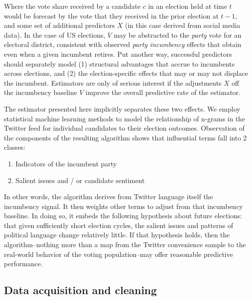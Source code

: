 \documentclass{article}
\begin{document}
Where the vote share received by a candidate $c$ in an election held
at time $t$ would be forecast by the vote that they received in the
prior election at $t-1$, and some set of additional predictors $X$ (in
this case derived from social media data). In the case of US
elections, $V$ may be abstracted to the \textit{party} vote for an
electoral district, consistent with observed \textit{party incumbency}
effects that obtain even when a given incumbent retires. Put another
way, successful predictors should separately model (1) structural
advantages that accrue to incumbents across elections, and (2) the
election-specific effects that may or may not displace the
incumbent. Estimators are only of serious interest if the adjustments
$X$ off the incumbency baseline $V$ improve the overall predictive
rate of the estimator. 

The estimator presented here implicitly separates these two
effects. We employ statistical machine learning methods to model the
relationship of n-grams in the Twitter feed for individual candidates
to their election outcomes. Observation of the components of the
resulting algorithm shows that influential terms fall into 2 classes:

\begin{enumerate}
\item Indicators of the incumbent party
\item Salient issues and / or candidate sentiment
\end{enumerate}

In other words, the algorithm derives from Twitter language itself the
incumbency signal. It then weights other terms to adjust from that
incumbency baseline. In doing so, it embeds the following hypothesis
about future elections: that given sufficiently short election cycles,
the salient issues and patterns of political language change
relatively little. If that hypothesis holds, then the
algorithm--nothing more than a map from the Twitter convenience sample
to the real-world behavior of the voting population--may offer
reasonable predictive performance. 

\subsection{Data acquisition and cleaning}
\label{sec:data-acquisition}
\end{document}
